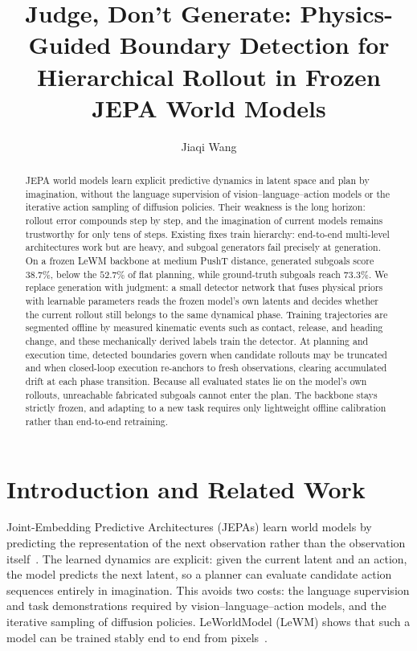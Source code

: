 \documentclass[11pt]{article}
\title{\textbf{Judge, Don't Generate: Physics-Guided Boundary Detection for Hierarchical Rollout in Frozen JEPA World Models}}
\author{Jiaqi Wang}
\affil{Eindhoven University of Technology \\ \texttt{j.wang11@student.tue.nl}}
\date{}
\begin{document}
\maketitle

\begin{abstract}
JEPA world models learn explicit predictive dynamics in latent space and plan by imagination, without the language supervision of vision--language--action models or the iterative action sampling of diffusion policies. Their weakness is the long horizon: rollout error compounds step by step, and the imagination of current models remains trustworthy for only tens of steps. Existing fixes train hierarchy: end-to-end multi-level architectures work but are heavy, and subgoal generators fail precisely at generation. On a frozen LeWM backbone at medium PushT distance, generated subgoals score $38.7\%$, below the $52.7\%$ of flat planning, while ground-truth subgoals reach $73.3\%$. We replace generation with judgment: a small detector network that fuses physical priors with learnable parameters reads the frozen model's own latents and decides whether the current rollout still belongs to the same dynamical phase. Training trajectories are segmented offline by measured kinematic events such as contact, release, and heading change, and these mechanically derived labels train the detector. At planning and execution time, detected boundaries govern when candidate rollouts may be truncated and when closed-loop execution re-anchors to fresh observations, clearing accumulated drift at each phase transition. Because all evaluated states lie on the model's own rollouts, unreachable fabricated subgoals cannot enter the plan. The backbone stays strictly frozen, and adapting to a new task requires only lightweight offline calibration rather than end-to-end retraining.
\end{abstract}

\section{Introduction and Related Work}

Joint-Embedding Predictive Architectures (JEPAs) learn world models by predicting the representation of the next observation rather than the observation itself~\cite{lecun2022path,assran2023ijepa}. The learned dynamics are explicit: given the current latent and an action, the model predicts the next latent, so a planner can evaluate candidate action sequences entirely in imagination. This avoids two costs: the language supervision and task demonstrations required by vision--language--action models, and the iterative sampling of diffusion policies. LeWorldModel (LeWM) shows that such a model can be trained stably end to end from pixels~\cite{lewm2026}.
\end{document}
